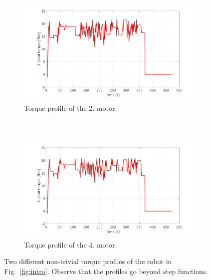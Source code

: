 \documentclass{ifacconf}
\begin{document}
\begin{figure}[t!]
	\centering
	\begin{subfigure}[b]{1.\columnwidth}
		\centering
		\includegraphics[height=2.1in]{./pictures/applications/T2.png}
		\caption{Torque profile of the 2. motor.}
	\end{subfigure}%
	~ 
	\begin{subfigure}[b]{1.\columnwidth}
		\centering
		\includegraphics[height=2.1in]{./pictures/applications/T4.png}
		\caption{Torque profile of the 4. motor.}
	\end{subfigure}
	\caption{Two different non-trivial  torque profiles of the robot in Fig.~\ref{fig:intro}. Observe that the profiles go beyond step functions. }
	\label{jointtorque}
\end{figure}
\end{document}
